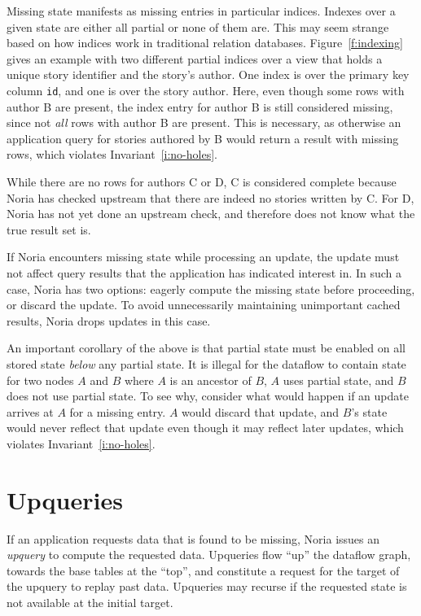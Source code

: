 Missing state manifests as missing entries in particular indices. Indexes over a
given state are either all partial or none of them are. This may seem strange
based on how indices work in traditional relation databases.
Figure~\vref{f:indexing} gives an example with two different partial indices
over a view that holds a unique story identifier and the story's author. One
index is over the primary key column \texttt{id}, and one is over the story
author. Here, even though some rows with author B are present, the index entry
for author B is still considered missing, since not \emph{all} rows with author
B are present. This is necessary, as otherwise an application query for stories
authored by B would return a result with missing rows, which violates
Invariant~\ref{i:no-holes}.

While there are no rows for authors C or D, C is considered complete because
Noria has checked upstream that there are indeed no stories written by C. For D,
Noria has not yet done an upstream check, and therefore does not know what the
true result set is.

If Noria encounters missing state while processing an update, the update must
not affect query results that the application has indicated interest in. In such
a case, Noria has two options: eagerly compute the missing state before
proceeding, or discard the update. To avoid unnecessarily maintaining
unimportant cached results, Noria drops updates in this case.

An important corollary of the above is that partial state must be enabled
on all stored state \emph{below} any partial state. It is illegal for the
dataflow to contain state for two nodes $A$ and $B$ where $A$ is an ancestor of
$B$, $A$ uses partial state, and $B$ does not use partial state. To see why,
consider what would happen if an update arrives at $A$ for a missing entry. $A$
would discard that update, and $B$'s state would never reflect that update even
though it may reflect later updates, which violates
Invariant~\ref{i:no-holes}.

\section{Upqueries}
\label{s:upqueries}

If an application requests data that is found to be missing, Noria issues an
\textit{upquery} to compute the requested data. Upqueries flow ``up'' the
dataflow graph, towards the base tables at the ``top'', and constitute a request
for the target of the upquery to replay past data. Upqueries may recurse if the
requested state is not available at the initial target.


